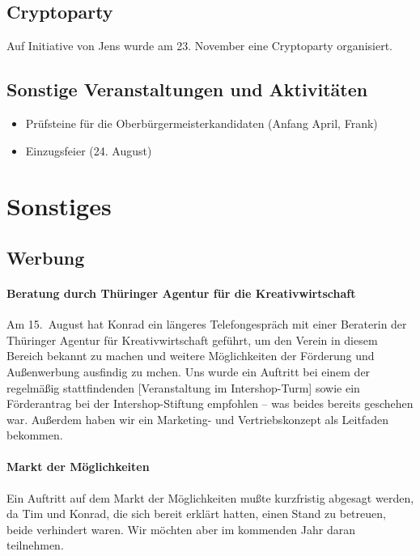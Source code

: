 \documentclass[10pt,DIV16]{scrartcl}
\begin{document}
\subsection{Cryptoparty}

Auf Initiative von Jens wurde am 23. November eine Cryptoparty organisiert.

\subsection{Sonstige Veranstaltungen und Aktivitäten}

\begin{itemize}
	\item Prüfsteine für die Oberbürgermeisterkandidaten (Anfang April, Frank)
	\item Einzugsfeier (24. August)
\end{itemize}



\section{Sonstiges}

\subsection{Werbung}

\paragraph{Beratung durch Thüringer Agentur für die Kreativwirtschaft}

Am 15.~August hat Konrad ein längeres Telefongespräch mit einer Beraterin der
Thüringer Agentur für Kreativwirtschaft geführt, um den Verein in diesem
Bereich bekannt zu machen und weitere Möglichkeiten der Förderung und
Außenwerbung ausfindig zu mchen.  Uns wurde ein Auftritt bei einem der
regelmäßig stattfindenden [Veranstaltung im Intershop-Turm] sowie ein
Förderantrag bei der Intershop-Stiftung empfohlen -- was beides bereits
geschehen war.  Außerdem haben wir ein Marketing- und Vertriebskonzept als
Leitfaden bekommen.

\paragraph{Markt der Möglichkeiten}

Ein Auftritt auf dem Markt der Möglichkeiten mußte kurzfristig abgesagt
werden, da Tim und Konrad, die sich bereit erklärt hatten, einen Stand zu
betreuen, beide verhindert waren.  Wir möchten aber im kommenden Jahr daran
teilnehmen.
\end{document}
